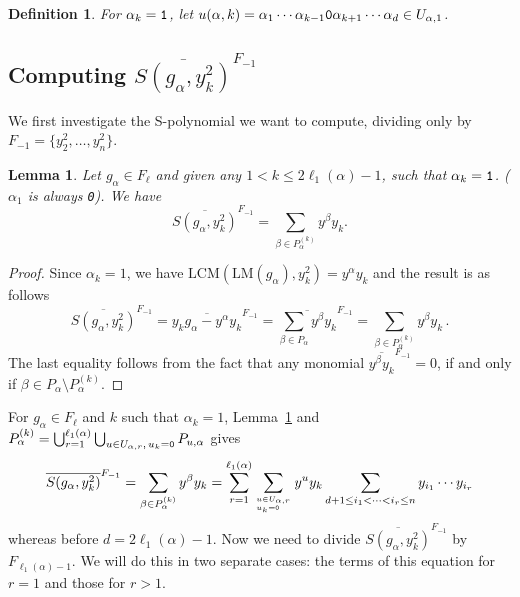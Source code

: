 \documentclass[10pt,a4paper]{article}
\newtheorem{lemma}{Lemma}[section]
\newtheorem{definition}{Definition}[section]
\begin{document}
\begin{definition} \label{u_alpha_one_k}
     For $\alpha_k=\textnormal{\texttt{1}}$, let $u(\alpha, k) = \alpha_1 \cdots \alpha_{k-1}\textnormal{\texttt{0}}\alpha_{k+1} \cdots \alpha_{d}\in U_{\alpha, 1}$.
\end{definition}

\subsection{Computing  $\overline{S(g_\alpha, y_k^2)}^{F_{-1}} $} \label{special_paths} We first investigate the S-polynomial we want to compute, dividing only by $F_{-1}=\{y_2^2,\ldots,y_n^2\}$.
\begin{lemma}
	    \label{spoly_lemma}
	    Let $g_\alpha \in F_\ell$ and
	     given any $1< k\le 2\ell_1(\alpha)-1$, such that $\alpha_k=\textnormal{\texttt{1}}$.  ($\alpha_1$ is always \textnormal{\texttt{0}}). We have
	    \begin{equation} \label{spoly_lemma_eqn}
    	    	\overline{S(g_\alpha, y_k^2)}^{F_{-1}} = \sum_{\beta \in P_{\alpha}^{(k)}} y^\beta y_k.
	    \end{equation}
    \end{lemma} 
\begin{proof} 
	Since $\alpha_k =1$, we have $\text{LCM}(\text{LM}(g_\alpha), y_k^2) = y^\alpha y_k$ and the result is as follows
	$$
		\overline{S(g_\alpha, y_k^2)}^{F_{-1}}   =  \overline{y_k g_\alpha -y^\alpha y_k}^{F_{-1}}  
		=  \overline{\sum_{\beta \in P_{\alpha}} y^\beta y_k }^{F_{-1}} 
		=\sum_{\beta \in P_{\alpha}^{(k)}} y^\beta y_k\,.
	$$
	The last equality follows from the fact that any monomial $\overline{y^\beta y_k }^{F_{-1}}=0$, if and only if $\beta\in P_\alpha\setminus  P_{\alpha}^{(k)}$.
\end{proof}

For $g_\alpha\in F_\ell$ and $k$ such that
$\alpha_k = 1$, Lemma~\ref{spoly_lemma} and $P_\alpha^{(k)} = \bigcup_{r = 1}^{\ell_1(\alpha)} \bigcup_{u \in U_{\alpha,r},\,u_k=\textnormal{\texttt{0}} } P_{u,\alpha}$ gives
\begin{equation}
 \label{spoly_lemma_eqn2}
	\overline{S(g_\alpha, y_k^2)}^{F_{-1}} = \sum_{\beta \in P_\alpha^{(k)}} y^\beta y_k  = \sum_{r=1}^{\ell_1(\alpha)}\sum_{u \in U_{\alpha,r}\atop u_k=\textnormal{\texttt{0}} \hfill} y^{u}y_k \sum_{d+1 \leq i_1 < \cdots < i_r \leq n} y_{i_1} \cdots y_{i_{r}}  
\end{equation} 
whereas before $d=2\ell_1(\alpha)-1$. Now we need to divide $\overline{S(g_\alpha, y_k^2)}^{F_{-1}}$ by $F_{\ell_1(\alpha)-1}$. We will do this in two separate cases: the terms of this equation for $r=1$ and those for $r>1$.
\end{document}
